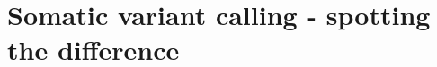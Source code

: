 \section[Somatic variant calling]{Somatic variant calling - spotting the difference}
\label{intro-sec:somatic}